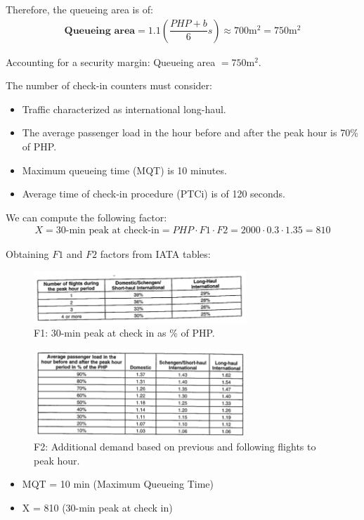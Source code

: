 \begin{enumerate}
Therefore, the queueing area is of:
\begin{align*}
\textbf{Queueing area}=1.1\left( \dfrac{PHP+b}{6}s\right) \approx 700 \mathrm{m^2} = 750 \mathrm{m^2}
\end{align*}

Accounting for a security margin: Queueing area $= 750\mathrm{m^2}$.

The number of check-in counters must consider:
\begin{itemize}
\item Traffic characterized as international long-haul.
\item The average passenger load in the hour before and after the peak hour is 70\% of PHP.
\item Maximum queueing time (MQT) is 10 minutes.
\item Average time of check-in procedure (PTCi) is of 120 seconds.
\end{itemize}

We can compute the following factor:
\begin{align*}
X = \text{30-min peak at check-in} = PHP\cdot F1\cdot F2 = 2000\cdot 0.3\cdot 1.35 = 810
\end{align*}

Obtaining $F1$ and $F2$ factors from IATA tables:

\begin{figure}[H]
	\centering
\includegraphics[width=8cm]{./images/IATA1}
\caption{F1: 30-min peak at check in as \% of PHP.}
\end{figure}

\begin{figure}[H]
	\centering
\includegraphics[width=8cm]{./images/IATA2}
\caption{F2: Additional demand based on previous and following flights to peak hour.}
\end{figure}

\begin{itemize}
\item MQT = 10 min (Maximum Queueing Time)
\item X = 810 (30-min peak at check in)
\end{itemize}


\end{enumerate}
